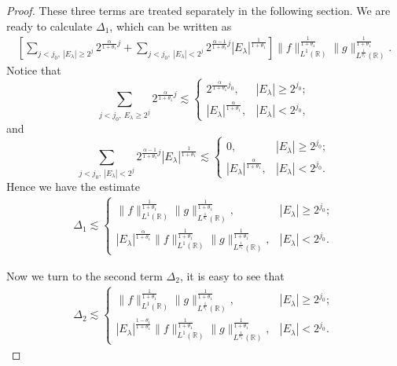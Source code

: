 \documentclass[11pt, twoside, leqno]{article}
\theoremstyle{definition}
\numberwithin{equation}{section}
\begin{document}
\begin{proof}
These three terms are treated separately in the following section. We are ready to calculate $\Delta_{1}$, which can be written as
\begin{align*}
\left[\sum\limits_{j<j_{0},~{|E_{\lambda}|\geq2^j}}2^{{\frac{\alpha}{1+\theta_{1}}}j}+
\sum\limits_{j<j_{0},~{|E_{\lambda}|<2^j}}2^{{\frac{\alpha-1}{1+\theta_{1}}}j}|E_\lambda|^{\frac{1}{1+\theta_{1}}}\right]
\|f\|_{L^{1}(\mathbb{R})}^{\frac{1}{1+\theta_{1}}}\|g\|_{L^{\frac{1}{\theta_1}}(\mathbb{R})}^{\frac{1}{1+\theta_{1}}}.
\end{align*}
Notice that
$$\sum\limits_{j<j_{0},~{E_{\lambda}\geq2^j}}2^{{\frac{\alpha}{1+\theta_{1}}}j}\lesssim
\begin{cases}
 2^{{\frac{\alpha}{1+\theta_{1}}}{j_0}} , & |E_\lambda|\geq2^{j_0}; \\
  |E_\lambda|^{\frac{\alpha}{1+\theta_{1}}}, & |E_\lambda|<2^{j_0},
\end{cases}$$
and
$$\sum\limits_{j<j_{0},~{|E_{\lambda}|<2^j}}2^{{\frac{\alpha-1}{1+\theta_{1}}}j}|E_\lambda|^{\frac{1}{1+\theta_{1}}}\lesssim
\begin{cases}
 0, & |E_\lambda|\geq2^{j_0}; \\
  |E_\lambda|^{\frac{\alpha}{1+\theta_{1}}}, & |E_\lambda|<2^{j_0}.
\end{cases}$$
Hence we have the estimate
\begin{align}\label{eq:4.9}
\Delta_{1}\lesssim
\begin{cases}
  \|f\|_{L^{1}(\mathbb{R})}^{\frac{1}{1+\theta_{1}}}\|g\|_{L^{\frac{1}{\theta_1}}(\mathbb{R})}^{\frac{1}{1+\theta_{1}}}, & |E_\lambda|\geq2^{j_0}; \\
  |E_\lambda|^{\frac{\alpha}{1+\theta_{1}}}\|f\|_{L^{1}(\mathbb{R})}^{\frac{1}{1+\theta_{1}}}\|g\|_{L^{\frac{1}{\theta_1}}(\mathbb{R})}^{\frac{1}{1+\theta_{1}}}, & |E_\lambda|<2^{j_0}.
\end{cases}
\end{align}

Now we turn to the second term $\Delta_{2}$, it is easy to see that
\begin{align}\label{eq:4.10}
\Delta_{2}\lesssim
\begin{cases}
   \|f\|_{L^{1}(\mathbb{R})}^{\frac{1}{1+\theta_{1}}}\|g\|_{L^{\frac{1}{\theta_1}}(\mathbb{R})}^{\frac{1}{1+\theta_{1}}}, &  |E_\lambda|\geq2^{j_0}; \\
   |E_\lambda|^{\frac{1-\theta_{1}}{1+\theta_{1}}}\|f\|_{L^{1}(\mathbb{R})}^{\frac{1}{1+\theta_{1}}}\|g\|_{L^{\frac{1}{\theta_1}}(\mathbb{R})}^{\frac{1}{1+\theta_{1}}}, & |E_\lambda|<2^{j_0}.
 \end{cases}
\end{align}


\end{proof}
\end{document}
